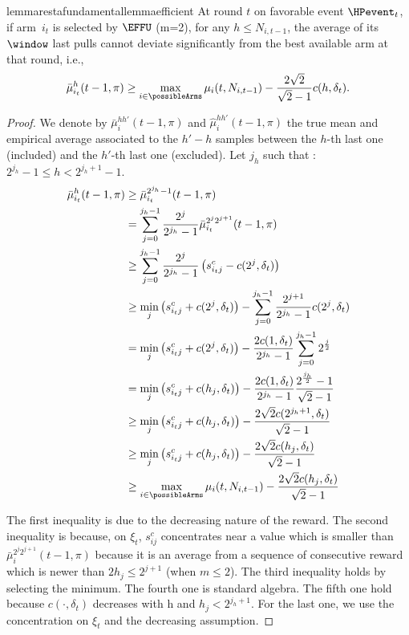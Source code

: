 \begin{restatable}{lemma}{restafundamentallemmaefficient}
\label{fundamental-lemma_efficient}
At round $t$ on favorable event $\HPevent_t$, if arm~$i_{t}$ is selected by $\EFFU$ (m=2), for any $h \leq N_{i,t-1}$,  the average of its $\window$ last pulls cannot deviate significantly from the best available arm at that round, i.e.,
%
\vspace{-4pt}
\begin{equation*}
\bar{\mu}^{h}_{i_{t}}(t-1,\pi) \geq \max_{i \in \possibleArms}\mu_i(t,N_{i,t-1}) - \frac{2\sqrt{2}}{\sqrt{2}-1} c(h, \delta_{t}).
\end{equation*}
\end{restatable}
\begin{proof}
We denote by $\bar{\mu}^{hh'}_i(t-1,\pi)$ and $\hat{\mu}^{hh'}_i(t-1,\pi)$ the true mean and empirical average associated to the $h'-h$ samples between the $h$-th last one (included) and the $h'$-th last one (excluded). Let $j_h$ such that :
$2^{j_h} -1 \leq  h < 2^{j_h+1}-1$.
\begin{align*}
\bar{\mu}^{h}_{i_t}(t-1,\pi) &\geq \bar{\mu}^{2^{j_h}-1}_{i_t}(t-1,\pi)\\ & = \sum_{j=0}^{j_h-1} \frac{2^j}{2^{j_h}-1} \bar{\mu}^{2^{j}2^{j+1}}_{i_t}(t-1,\pi)\\ & \geq \sum_{j=0}^{j_h-1} \frac{2^j}{2^{j_h}-1} \left(s_{i_tj}^c - c(2^j, \delta_t)\right)\\
& \geq \min_j\left(s_{i_tj}^c + c(2^j, \delta_t)\right) - \sum_{j=0}^{j_h-1} \frac{2^{j+1}}{2^{j_h}-1}c(2^j, \delta_t)\\
& = \min_j\left(s_{i_tj}^c + c(2^j, \delta_t)\right) - \frac{2c(1, \delta_t)}{2^{j_h}-1}\sum_{j=0}^{j_h-1} 2^{\frac{j}{2}}\\
& = \min_j\left(s_{i_tj}^c + c(h_j, \delta_t)\right) - \frac{2c(1, \delta_t)}{2^{j_h}-1} \frac{2^{\frac{j_h}{2}}-1}{\sqrt{2}-1}\\
& \geq \min_j\left(s_{i_tj}^c + c(h_j, \delta_t)\right) - \frac{2\sqrt{2}c(2^{j_h+1}, \delta_t)}{\sqrt{2}-1}\\
& \geq \min_j\left(s_{i_tj}^c + c(h_j, \delta_t)\right) - \frac{2\sqrt{2}c(h_j, \delta_t)}{\sqrt{2}-1}\\
& \geq \max_{i\in\possibleArms}\mu_i(t,N_{i,t-1})  - \frac{2\sqrt{2}c(h_j, \delta_t)}{\sqrt{2}-1} 
\end{align*}

The first inequality is due to the decreasing nature of the reward. The second inequality is because, on $\xi_t$, $s_{ij}^c$ concentrates near a value which is smaller than $\bar{\mu}^{2^{j}2^{j+1}}_i(t-1,\pi)$  because it is an average from a sequence of consecutive reward which is newer than $2h_j \leq 2^{j+1}$ (when $m \leq 2$). The third inequality holds by selecting the minimum. The fourth one is standard algebra. The fifth one hold because $c( \cdot, \delta_t)$ decreases with h and $h_j < 2^{j_h+1}$. For the last one, we use the concentration on $\xi_t$ and the decreasing assumption. 


\end{proof}


